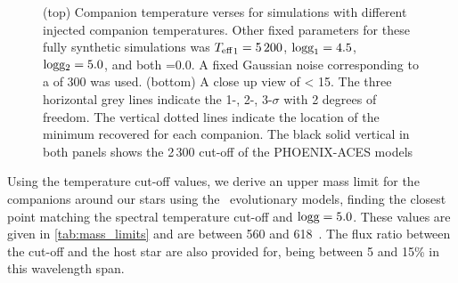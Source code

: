 \begin{figure}
    \centering
    \caption{(top) Companion temperature verses \textchisquared{} for simulations with different injected companion temperatures.
Other fixed parameters for these fully synthetic simulations was \({T_{\mathrm{eff}}}_{1}=5\,200\)\K{}, \(\textrm{logg}_1=4.5\), \(\textrm{logg}{}_2=5.0\), and both \feh{}=0.0.
A fixed Gaussian noise corresponding to a \snr{} of 300 was used.
       (bottom) A close up view of \textchisquared{} < 15.
The three horizontal grey lines indicate the 1-, 2-, 3-$\sigma$ with 2 degrees of freedom.
The vertical dotted lines indicate the location of the minimum \textchisquared{} recovered for each companion.
The black solid vertical in both panels shows the 2\,300\K{} cut-off of the {PHOENIX-ACES} models}
    \label{fig:injection_shape}
\end{figure}




Using the temperature cut-off values, we derive an upper mass limit for the companions around our stars using the~\citet{baraffe_new_2015} evolutionary models, finding the closest point matching the spectral temperature cut-off and \(\textrm{logg}{}=5.0\).
These values are given in \cref{tab:mass_limits} and are between 560 and 618~\Mjup{}.
The flux ratio between the cut-off and the host star are also provided for, being between 5 and 15\% in this wavelength span.








